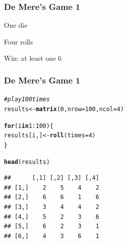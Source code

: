 \documentclass[12pt]{beamer}\usepackage[]{graphicx}\usepackage[]{color}
\makeatletter
\newcommand{\hlnum}[1]{\textcolor[rgb]{0.686,0.059,0.569}{#1}}%
\newcommand{\hlcom}[1]{\textcolor[rgb]{0.678,0.584,0.686}{\textit{#1}}}%
\newcommand{\hlopt}[1]{\textcolor[rgb]{0,0,0}{#1}}%
\newcommand{\hlstd}[1]{\textcolor[rgb]{0.345,0.345,0.345}{#1}}%
\newcommand{\hlkwa}[1]{\textcolor[rgb]{0.161,0.373,0.58}{\textbf{#1}}}%
\newcommand{\hlkwb}[1]{\textcolor[rgb]{0.69,0.353,0.396}{#1}}%
\newcommand{\hlkwc}[1]{\textcolor[rgb]{0.333,0.667,0.333}{#1}}%
\newcommand{\hlkwd}[1]{\textcolor[rgb]{0.737,0.353,0.396}{\textbf{#1}}}%
\newenvironment{kframe}{%
 \def\at@end@of@kframe{}%
 \ifinner\ifhmode%
  \def\at@end@of@kframe{\end{minipage}}%
  \begin{minipage}{\columnwidth}%
 \fi\fi%
 \def\FrameCommand##1{\hskip\@totalleftmargin \hskip-\fboxsep
 \colorbox{shadecolor}{##1}\hskip-\fboxsep
     \hskip-\linewidth \hskip-\@totalleftmargin \hskip\columnwidth}%
 \MakeFramed {\advance\hsize-\width
   \@totalleftmargin\z@ \linewidth\hsize
   \@setminipage}}%
 {\par\unskip\endMakeFramed%
 \at@end@of@kframe}
\newenvironment{knitrout}{}{} %
\makeatother
\begin{document}

\begin{frame}
\begin{center}
\Huge{}
\end{center}
\end{frame}


\begin{frame}[fragile]
\frametitle{De Mere's Game 1}

\bi
  \item One die
  \item Four rolls
  \item Win: at least one 6
\ei
\eb

\end{frame}


\begin{frame}[fragile]
\frametitle{De Mere's Game 1}

\begin{knitrout}\footnotesize
{}\color{fgcolor}\begin{kframe}
\begin{alltt}
\hlcom{# play 100 times}
\hlstd{results} \hlkwb{<-} \hlkwd{matrix}\hlstd{(}\hlnum{0}\hlstd{,} \hlkwc{nrow} \hlstd{=} \hlnum{100}\hlstd{,} \hlkwc{ncol} \hlstd{=} \hlnum{4}\hlstd{)}

\hlkwa{for} \hlstd{(i} \hlkwa{in} \hlnum{1}\hlopt{:}\hlnum{100}\hlstd{) \{}
  \hlstd{results[i, ]} \hlkwb{<-} \hlkwd{roll}\hlstd{(}\hlkwc{times} \hlstd{=} \hlnum{4}\hlstd{)}
\hlstd{\}}

\hlkwd{head}\hlstd{(results)}
\end{alltt}
\begin{verbatim}
##      [,1] [,2] [,3] [,4]
## [1,]    2    5    4    2
## [2,]    6    6    1    6
## [3,]    3    4    4    2
## [4,]    5    2    3    6
## [5,]    6    2    3    1
## [6,]    4    3    6    1
\end{verbatim}
\end{kframe}
\end{knitrout}

\end{frame}

\end{document}
